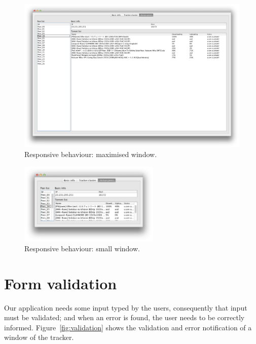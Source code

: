 \documentclass[twoside,a4paper,10pt]{article}
\begin{document}
\begin{figure}[!htp]
  \centering
  \includegraphics[width=\textwidth]{imgs/responsive_design_maximized.png}
  \caption{\label{fig:resp-maxi}Responsive behaviour: maximised window.}
\end{figure}

\begin{figure}[!htp]
  \centering
  \includegraphics[width=0.6\textwidth]{imgs/responsive_design.png}
  \caption{\label{fig:resp-small}Responsive behaviour: small window.}
\end{figure}

\FloatBarrier

\section{Form validation}

Our application needs some input typed by the users, consequently that input
must be validated; and when an error is found, the user needs to be correctly
informed. Figure~\ref{fig:validation}
shows the validation and error notification of a window of the tracker.
\end{document}
